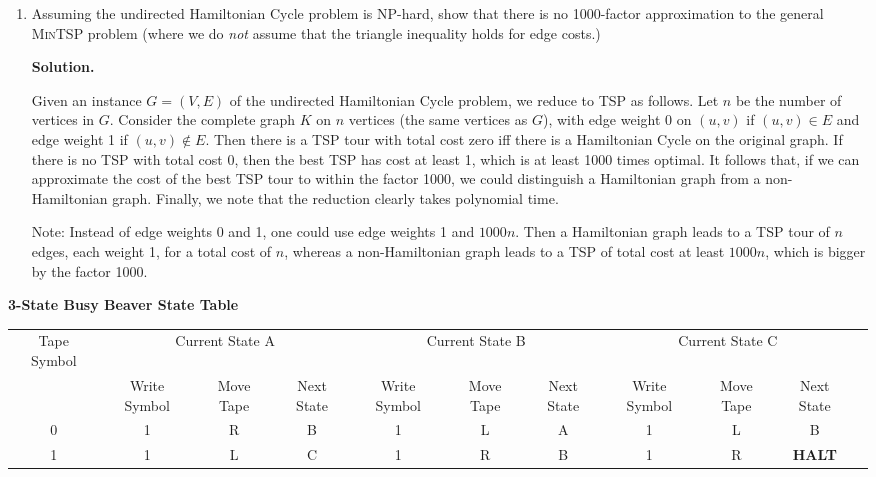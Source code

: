 \documentclass[2pt]{scrartcl}
\newcommand\solution{\textbf{Solution.}}
\begin{document}
\begin{multicols}{6}
\begin{enumerate}
\vspace*{2in}

\item Assuming the undirected Hamiltonian Cycle problem is NP-hard,
  show that there is no 1000-factor approximation to the general
  \textsc{MinTSP} problem (where we do {\em not} assume that the
  triangle inequality holds for edge costs.)

\solution

Given an instance $G=(V,E)$ of the undirected Hamiltonian Cycle
problem, we reduce to TSP as follows.  Let $n$ be the number of
vertices in $G$.  Consider the complete graph $K$ on $n$ vertices (the
same vertices as $G$), with edge weight 0 on $(u,v)$ if $(u,v)\in E$
and edge weight 1 if $(u,v)\not\in E$.  Then there is a TSP tour with
total cost zero iff there is a Hamiltonian Cycle on the original
graph.  If there is no TSP with total cost 0, then the best TSP has
cost at least 1, which is at least 1000 times optimal.  It follows
that, if we can approximate the cost of the best TSP tour to within
the factor 1000, we could distinguish a Hamiltonian graph from a
non-Hamiltonian graph.  Finally, we note that the reduction clearly
takes polynomial time.

Note:  Instead of edge weights 0 and 1, one could use edge weights 1
and $1000n$.  Then a Hamiltonian graph leads to a TSP tour of $n$
edges, each weight 1, for a total cost of $n$, whereas a
non-Hamiltonian graph leads to a TSP of total cost at least $1000n$,
which is bigger by the factor 1000.
\end{enumerate}

  \end{multicols}


  {\bf 3-State Busy Beaver State Table}

  \begin{tabular}{|c|c|c|c|c|c|c|c|c|c|c|}
    \hline
    Tape Symbol & \multicolumn{3}{|c|}{Current State A} & \multicolumn{3}{|c|}{Current State B} & \multicolumn{3}{|c|}{Current State C} \\
                & Write Symbol & Move Tape & Next State & Write Symbol & Move Tape & Next State & Write Symbol & Move Tape & Next State\\
    \hline
    0 & 1 & R & B & 1 & L & A & 1 & L & B\\
    1 & 1 & L & C & 1 & R & B & 1 & R & {\bf HALT}\\
    \hline
  \end{tabular}
  
\end{document}
